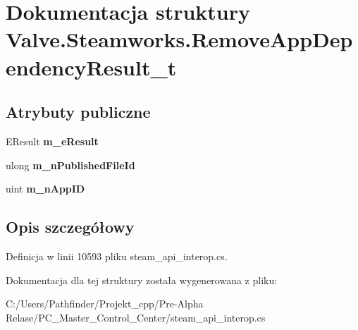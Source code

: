 \hypertarget{struct_valve_1_1_steamworks_1_1_remove_app_dependency_result__t}{}\section{Dokumentacja struktury Valve.\+Steamworks.\+Remove\+App\+Dependency\+Result\+\_\+t}
\label{struct_valve_1_1_steamworks_1_1_remove_app_dependency_result__t}
\subsection*{Atrybuty publiczne}
\begin{DoxyCompactItemize}
\item 
\mbox{\label{struct_valve_1_1_steamworks_1_1_remove_app_dependency_result__t_ad5c87c3a9f4acdf5021c438585f865e0}} 
E\+Result {\bfseries m\+\_\+e\+Result}
\item 
\mbox{\label{struct_valve_1_1_steamworks_1_1_remove_app_dependency_result__t_a5f7168ee78baac1f94efe462a64c94b9}} 
ulong {\bfseries m\+\_\+n\+Published\+File\+Id}
\item 
\mbox{\label{struct_valve_1_1_steamworks_1_1_remove_app_dependency_result__t_a81f5d9deac1afe2d326d296fb4eb4208}} 
uint {\bfseries m\+\_\+n\+App\+ID}
\end{DoxyCompactItemize}


\subsection{Opis szczegółowy}


Definicja w linii 10593 pliku steam\+\_\+api\+\_\+interop.\+cs.



Dokumentacja dla tej struktury została wygenerowana z pliku\+:\begin{DoxyCompactItemize}
\item 
C\+:/\+Users/\+Pathfinder/\+Projekt\+\_\+cpp/\+Pre-\/\+Alpha Relase/\+P\+C\+\_\+\+Master\+\_\+\+Control\+\_\+\+Center/steam\+\_\+api\+\_\+interop.\+cs\end{DoxyCompactItemize}
